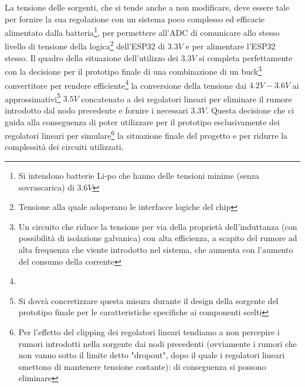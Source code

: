\documentclass[a4paper, 10pt, final]{article} %
\begin{document}
    La tensione delle sorgenti, che si tende anche a non modificare, deve essere tale per fornire la sua regolazione con un sistema poco complesso ed efficacie alimentato dalla batteria\footnote{Si intendono batterie Li-po che hanno delle tensioni minime (senza sovrascarica) di $3.6V$}, per permettere all'ADC di comunicare allo stesso livello di tensione della logica\footnote{Tensione alla quale adoperano le interfacce logiche del chip} dell'ESP32 di $3.3V$ e per alimentare l'ESP32 stesso.    
    Il quadro della situazione dell'utilizzo dei $3.3V$ si completa perfettamente con la decisione per il prototipo finale di una combinazione di un buck\footnote{Un circuito che riduce la tensione per via della propriet\`{a} dell'induttanza (con possibilit\`{a} di isolazione galvanica) con alta efficienza, a scapito del rumore ad alta frequenza che viente introdotto nel sistema, che aumenta con l'aumento del consumo della corrente} convertitore per rendere efficiente\footnote{} la conversione della tensione dai $4.2V-3.6V$ ai approssimativi\footnote{Si dovr\`{a} concretizzare questa misura durante il design della sorgente del prototipo finale per le caratteristiche specifiche ai componenti scelti} $3.5V$ concatenato a dei regolatori lineari per eliminare il rumore introdotto dal nodo precedente e fornire i necessari $3.3V$.
    Questa decisione che ci guida alla conseguenza di poter utilizzare per il prototipo esclusivamente dei regolatori lineari per simulare\footnote{Per l'effetto del clipping dei regolatori lineari tendiamo a non percepire i rumori introdotti nella sorgente dai nodi precedenti (ovviamente i rumori che non vanno sotto il limite detto "dropout", dopo il quale i regolatori lineari smettono di mantenere tensione costante): di conseguenza si possono eliminare} la situazione finale del progetto e per ridurre la complessit\`{a} dei circuiti utilizzati.
\end{document}
